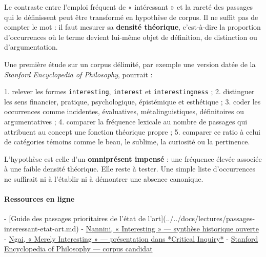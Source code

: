 \documentclass[10pt,a4paper]{article}
\begin{document}
Le contraste entre l'emploi fréquent de « intéressant » et la rareté des passages qui le définissent peut être transformé en hypothèse de corpus. Il ne suffit pas de compter le mot : il faut mesurer sa \textbf{densité théorique}, c'est-à-dire la proportion d'occurrences où le terme devient lui-même objet de définition, de distinction ou d'argumentation.

Une première étude sur un corpus délimité, par exemple une version datée de la \emph{Stanford Encyclopedia of Philosophy}, pourrait :

1. relever les formes \texttt{interesting}, \texttt{interest} et \texttt{interestingness} ; 2. distinguer les sens financier, pratique, psychologique, épistémique et    esthétique ; 3. coder les occurrences comme incidentes, évaluatives, métalinguistiques,    définitoires ou argumentatives ; 4. comparer la fréquence lexicale au nombre de passages qui attribuent au concept    une fonction théorique propre ; 5. comparer ce ratio à celui de catégories témoins comme le beau, le sublime, la    curiosité ou la pertinence.

L'hypothèse est celle d'un \textbf{omniprésent impensé} : une fréquence élevée associée à une faible densité théorique. Elle reste à tester. Une simple liste d'occurrences ne suffirait ni à l'établir ni à démontrer une absence canonique.

\paragraph{Ressources en ligne}
- [Guide des passages prioritaires de l'état de l'art](../../docs/lectures/passages-interessant-etat-art.md) - \href{\detokenize{https://lexicon.mimesisjournals.com/archive/2018/autumn/Interesting.pdf}}{Nannini, « Interesting » — synthèse historique ouverte} - \href{\detokenize{https://criticalinquiry.uchicago.edu/past_issues/issue/summer_2008_v34_n4/}}{Ngai, « Merely Interesting » — présentation dans *Critical Inquiry*} - \href{\detokenize{https://plato.stanford.edu/}}{Stanford Encyclopedia of Philosophy — corpus candidat}
\end{document}
